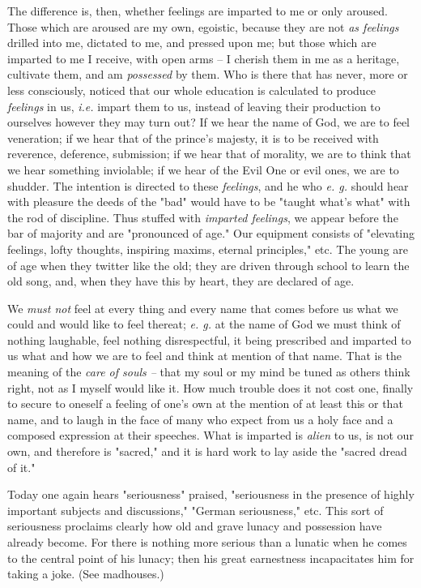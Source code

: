 The difference is, then, whether feelings are imparted to me or only aroused. 
Those which are aroused are my own, egoistic, because they are not \textit{as 
feelings} drilled into me, dictated to me, and pressed upon me; but those 
which are imparted to me I receive, with open arms -- I cherish them in me as 
a heritage, cultivate them, and am \textit{possessed} by them. Who is there 
that has never, more or less consciously, noticed that our whole education is 
calculated to produce \textit{feelings} in us, \textit{i.e.} impart them to 
us, instead of leaving their production to ourselves however they may turn 
out? If we hear the name of God, we are to feel veneration; if we hear that of 
the prince's majesty, it is to be received with reverence, deference, 
submission; if we hear that of morality, we are to think that we hear 
something inviolable; if we hear of the Evil One or evil ones, we are to 
shudder. The intention is directed to these \textit{feelings}, and he who 
\textit{e. g.} should hear with pleasure the deeds of the "{}bad"{} would have 
to be "{}taught what's what"{} with the rod of discipline. Thus stuffed with 
\textit{imparted feelings}, we appear before the bar of majority and are 
"{}pronounced of age."{} Our equipment consists of "{}elevating feelings, 
lofty thoughts, inspiring maxims, eternal principles,"{} etc. The young are of 
age when they twitter like the old; they are driven through school to learn 
the old song, and, when they have this by heart, they are declared of age.

We \textit{must not} feel at every thing and every name that comes before us 
what we could and would like to feel thereat; \textit{e. g.} at the name of 
God we must think of nothing laughable, feel nothing disrespectful, it being 
prescribed and imparted to us what and how we are to feel and think at mention 
of that name. That is the meaning of the \textit{care of souls --} that my 
soul or my mind be tuned as others think right, not as I myself would like it. 
How much trouble does it not cost one, finally to secure to oneself a feeling 
of one's own at the mention of at least this or that name, and to laugh in the 
face of many who expect from us a holy face and a composed expression at their 
speeches. What is imparted is \textit{alien} to us, is not our own, and 
therefore is "{}sacred,"{} and it is hard work to lay aside the "{}sacred 
dread of it."{}

Today one again hears "{}seriousness"{} praised, "{}seriousness in the 
presence of highly important subjects and discussions,"{} "{}German 
seriousness,"{} etc. This sort of seriousness proclaims clearly how old and 
grave lunacy and possession have already become. For there is nothing more 
serious than a lunatic when he comes to the central point of his lunacy; then 
his great earnestness incapacitates him for taking a joke. (See madhouses.)

